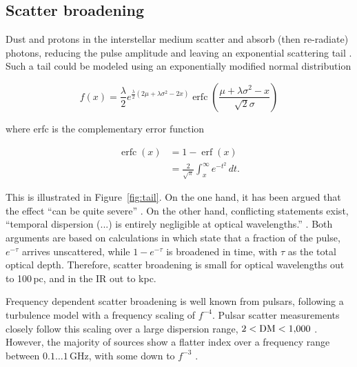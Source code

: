 \documentclass[twocolumn,tighten,longauthor]{myaastex62}
\begin{document}
\subsection{Scatter broadening}
\label{sub:interstellar_scatter_broadening}
Dust and protons in the interstellar medium scatter and absorb (then re-radiate) photons, reducing the pulse amplitude and leaving an exponential scattering tail \citep{2002astro.ph..7156C}. Such a tail could be modeled using an exponentially modified normal distribution \citep{Grushka1972}

\begin{equation}
{\displaystyle f(x)={\frac {\lambda }{2}}e^{{\frac {\lambda }{2}}(2\mu +\lambda \sigma ^{2}-2x)}\operatorname {erfc} \left({\frac {\mu +\lambda \sigma ^{2}-x}{{\sqrt {2}}\sigma }}\right)}
\end{equation}

where erfc is the complementary error function

\begin{equation}
{\begin{aligned}\operatorname {erfc}(x)&=1-\operatorname {erf}(x)\\&={\frac  {2}{{\sqrt  {\pi }}}}\int _{x}^{\infty }e^{{-t^{2}}}\,dt.\end{aligned}}
\end{equation}

This is illustrated in Figure~\ref{fig:tail}. On the one hand, it has been argued that the effect ``can be quite severe'' \citep{2000ASPC..213..545H,2001SPIE.4273..119H,2004ApJ...613.1270H}. On the other hand, conflicting statements exist, ``temporal dispersion (...) is entirely negligible at optical wavelengths.'' \citep{Howard2000}. Both arguments are based on calculations in \citet[][Appendix M.\,3]{Cordes2002} which state that a fraction of the pulse, $e^{-\tau}$ arrives unscattered, while $1-e^{-\tau}$ is broadened in time, with $\tau$ as the total optical depth. Therefore, scatter broadening is small for optical wavelengths out to 100\,pc, and in the IR out to kpc.

Frequency dependent scatter broadening is well known from pulsars, following a \citet{1941DoSSR..30..301K} turbulence model with a frequency scaling of $f^{-4}$. Pulsar scatter measurements closely follow this scaling over a large dispersion range, $2<{\rm DM}<1{,}000$ \citep{2015ApJ...804...23K}. However, the majority of sources show a flatter index over a frequency range between $0.1 \dots 1$\,GHz, with some down to $f^{-3}$ \citep{2017ApJ...846..104K,2017ApJ...835....2X}.
\end{document}
